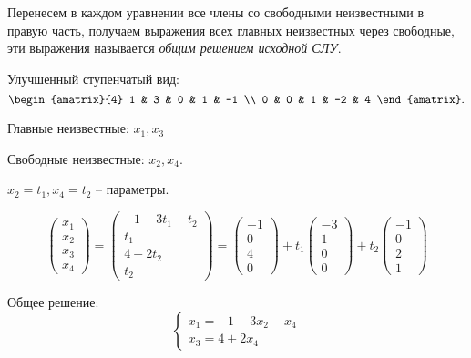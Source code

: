 \begin{description}
\begin{description}
        Перенесем в каждом уравнении все члены со свободными неизвестными в правую часть, получаем выражения всех главных неизвестных через свободные, эти выражения называется \textit{общим решением исходной СЛУ}.
    \end{description}
\end{description}

\begin{example}
    Улучшенный ступенчатый вид:
    \begin{equation*}
        \begin{amatrix}{4}
            1 & 3 & 0 & 1 & -1 \\
            0 & 0 & 1 & -2 & 4
        \end{amatrix} 
    .\end{equation*}

    Главные неизвестные: $x_1, x_3$

    Свободные неизвестные: $x_2, x_4$.

    $x_2 = t_1, x_4 = t_2$ -- параметры.

    \begin{equation*}
        \begin{pmatrix} x_1 \\ x_2 \\ x_3 \\ x_4 \end{pmatrix} 
        = 
        \begin{pmatrix} -1 - 3t_1 - t_2 \\ t_1 \\ 4 + 2t_2 \\ t_2 \end{pmatrix} 
        =
        \begin{pmatrix} -1 \\ 0 \\ 4 \\ 0 \end{pmatrix} 
        +
        t_1
        \begin{pmatrix} -3 \\ 1 \\ 0 \\ 0 \end{pmatrix} 
        +
        t_2
        \begin{pmatrix} -1 \\ 0 \\ 2 \\ 1 \end{pmatrix} 
    \end{equation*}

    Общее решение:
    \begin{equation*}
        \begin{cases}
            x_1 = -1 - 3x_2 - x_4 \\
            x_3 = 4 + 2x_4
        \end{cases}
    \end{equation*}
\end{example}

